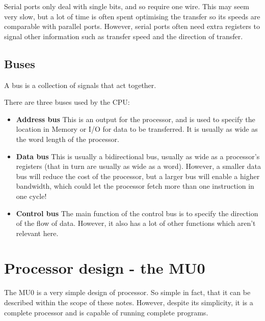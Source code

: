 Serial ports only deal with single bits, and so require one wire. This may seem
very slow, but a lot of time is often spent optimising the transfer so its
speeds are comparable with parallel ports. However, serial ports often need
extra registers to signal other information such as transfer speed and the
direction of transfer.

\subsection{Buses}

A bus is a collection of signals that act together.

There are three buses used by the CPU:

\begin{itemize}
	\item {\bf Address bus}
		This is an output for the processor, and is used to specify the location
		in Memory or I/O for data to be transferred. It is usually as wide as
		the word length of the processor.
	
	\item {\bf Data bus}
		This is usually a bidirectional bus, usually as wide as a processor's
		registers (that in turn are usually as wide as a word). However, a
		smaller data bus will reduce the cost of the processor, but a larger bus
		will enable a higher bandwidth, which could let the processor fetch more
		than one instruction in one cycle!

	\item {\bf Control bus}
		The main function of the control bus is to specify the direction of the
		flow of data. However, it also has a lot of other functions which aren't
		relevant here.
\end{itemize}

\section{Processor design - the MU0}

The MU0 is a very simple design of processor. So simple in fact, that it can be
described within the scope of these notes. However, despite its simplicity, it
is a complete processor and is capable of running complete programs.

